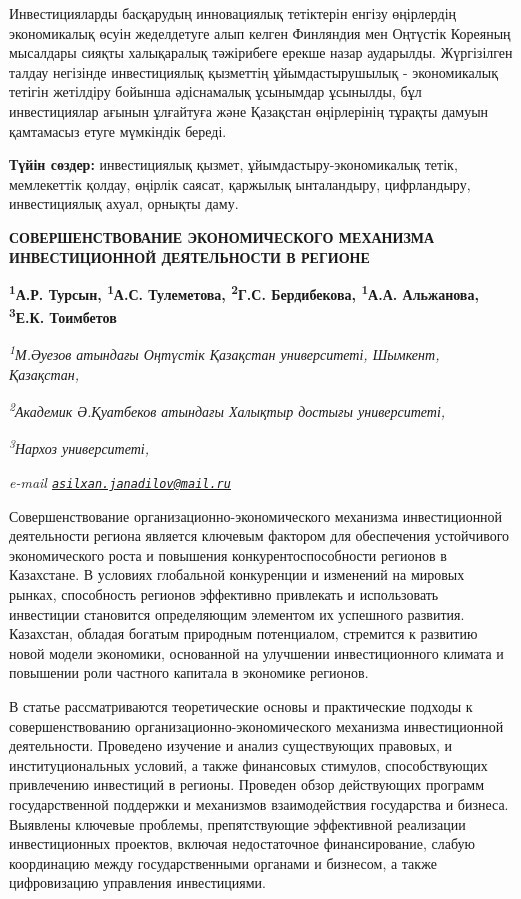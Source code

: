Инвестицияларды басқарудың инновациялық тетіктерін енгізу өңірлердің
экономикалық өсуін жеделдетуге алып келген Финляндия мен Оңтүстік
Кореяның мысалдары сияқты халықаралық тәжірибеге ерекше назар аударылды.
Жүргізілген талдау негізінде инвестициялық қызметтің
ұйымдастырушылық - экономикалық тетігін жетілдіру бойынша әдіснамалық
ұсынымдар ұсынылды, бұл инвестициялар ағынын ұлғайтуға және Қазақстан
өңірлерінің тұрақты дамуын қамтамасыз етуге мүмкіндік береді.

{\bfseries Түйін сөздер:} инвестициялық қызмет, ұйымдастыру-экономикалық
тетік, мемлекеттік қолдау, өңірлік саясат, қаржылық ынталандыру,
цифрландыру, инвестициялық ахуал, орнықты даму.

\begin{articleheader}
{\bfseries СОВЕРШЕНСТВОВАНИЕ ЭКОНОМИЧЕСКОГО МЕХАНИЗМА ИНВЕСТИЦИОННОЙ ДЕЯТЕЛЬНОСТИ В РЕГИОНЕ}

{\bfseries
\textsuperscript{1}А.Р. Турсын\textsuperscript{\envelope },
\textsuperscript{1}А.С. Тулеметова,
\textsuperscript{2}Г.С. Бердибекова,
\textsuperscript{1}А.А. Альжанова,
\textsuperscript{3}Е.К. Тоимбетов}
\end{articleheader}

\begin{affiliation}
\emph{\textsuperscript{1}М.Әуезов атындағы Оңтүстік Қазақстан университеті, Шымкент, Қазақстан,}

\emph{\textsuperscript{2}Академик Ә.Қуатбеков атындағы Халықтыр достығы университеті,}

\emph{\textsuperscript{3}Нархоз университеті,}

\emph{e-mail \href{mailto:asilxan.janadilov@mail.ru}{\nolinkurl{asilxan.janadilov@mail.ru}}}
\end{affiliation}

Совершенствование организационно-экономического механизма инвестиционной
деятельности региона является ключевым фактором для обеспечения
устойчивого экономического роста и повышения конкурентоспособности
регионов в Казахстане. В условиях глобальной конкуренции и изменений на
мировых рынках, способность регионов эффективно привлекать и
использовать инвестиции становится определяющим элементом их успешного
развития. Казахстан, обладая богатым природным потенциалом, стремится к
развитию новой модели экономики, основанной на улучшении инвестиционного
климата и повышении роли частного капитала в экономике регионов.

В статье рассматриваются теоретические основы и практические подходы к
совершенствованию организационно-экономического механизма инвестиционной
деятельности. Проведено изучение и анализ существующих правовых, и
институциональных условий, а также финансовых стимулов, способствующих
привлечению инвестиций в регионы. Проведен обзор действующих программ
государственной поддержки и механизмов взаимодействия государства и
бизнеса. Выявлены ключевые проблемы, препятствующие эффективной
реализации инвестиционных проектов, включая недостаточное
финансирование, слабую координацию между государственными органами и
бизнесом, а также цифровизацию управления инвестициями.

